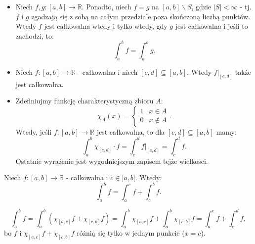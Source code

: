 \documentclass{article}
\newcounter{defi}
\numberwithin{defi}{section}
\numberwithin{defi}{section}
\newcommand{\R}{\mathbb{R}}
\newcommand{\oo}{\infty}
\newcommand{\se}{\subseteq}
\begin{document}
\begin{obs}[label=obs:punkt-roznica-calek]{} 
    \begin{itemize}
        \item Niech $f, g: [a, b]  \to \R$. Ponadto, niech $f = g$ na $[a, b] \backslash S$, gdzie $|S| < \oo$ - tj. $f$ i $g$ zgadzają się z sobą na całym przedziale poza skończoną  liczbą punktów. \\
        Wtedy $f$ jest całkowalna wtedy i tylko wtedy, gdy $g$ jest całkowalna i jeśli to zachodzi, to: \begin{equation*}
            \int_{a}^{b} f = \int_{a}^{b} g.
        \end{equation*}
        \item Niech $f: [a, b] \to \R$ - całkowalna i niech $[c, d] \se [a, b]$. Wtedy $f \big|_{[c, d]}$ także jest całkowalna.
        \item Zdefiniujmy funkcję charakterystyczną zbioru $A$: \begin{equation}
            \chi_A(x) = \begin{cases}
                1 & x \in A \\
                0 & x \notin A
            \end{cases}.
        \end{equation} 
        Wtedy, jeśli $f: [a, b] \to \R$ jest całkowalna, to dla $[c, d] \se [a, b]$ mamy: \begin{equation}
            \int_{a}^{b} \chi_{[c, d]}\cdot  f = \int_{c}^{d} f \big|_{[c, d]} = \int_{c}^{d} f.
        \end{equation} Ostatnie wyrażenie jest wygodniejszym zapisem tejże wielkości.
    \end{itemize}
\end{obs}


\begin{twier}{}
    Niech $f: [a, b] \to \R$ - całkowalna i $c \in ]a, b[$. Wtedy: \begin{equation}
        \int_{a}^{b} f = \int_{a}^{c} f + \int_{c}^{b} f.
    \end{equation}
\end{twier}

\begin{dow}{}
    \begin{equation}
        \int_{a}^{b} f = \int_{a}^{b} (\chi_{[a, c] } f + \chi_{[c, b]}  f) =  \int_{a}^{b} \chi_{[a, c] } f + \int_{a}^{b} \chi_{[c, b]}  f = \int_{a}^{c} f  + \int_{c}^{d} f,
    \end{equation} bo $f$ i $\chi_{[a, c] } f + \chi_{[c, b]}  f$ różnią się tylko w jednym punkcie ($x = c$). 
\end{dow}
\end{document}
